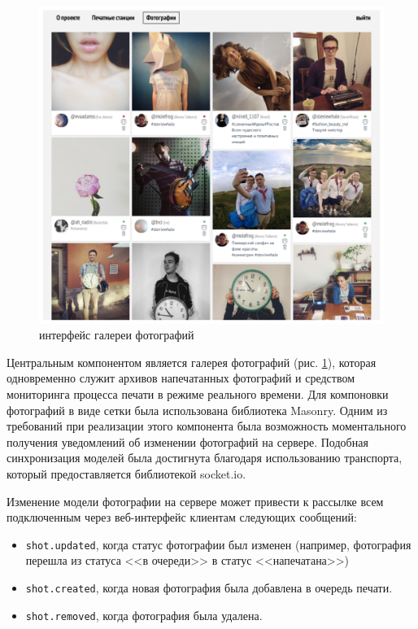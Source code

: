 \documentclass[a4paper,14pt,href,draft]{article}
\begin{document}
\begin{figure}[htbp]
\begin{center}
  \includegraphics[scale=0.53]{grid-interface.pdf}
    \caption{интерфейс галереи фотографий}
    \label{fig:GridInterface}
\end{center}
\end{figure}

Центральным компонентом является галерея фотографий (рис. \ref{fig:GridInterface}), которая одновременно служит
архивов напечатанных фотографий и средством мониторинга процесса печати в режиме реального времени. Для компоновки
фотографий в виде сетки была использована библиотека Masonry\cite{Masonry}. Одним из требований при реализации
этого компонента была возможность моментального получения уведомлений об изменении фотографий на сервере.
Подобная синхронизация моделей была достигнута благодаря использованию транспорта, который предоставляется библиотекой
socket.io\cite{SocketIO}.

Изменение модели фотографии на сервере может привести к рассылке всем подключенным через веб-интерфейс клиентам
следующих сообщений:
\begin{itemize}
  \item \texttt{shot.updated}, когда статус фотографии был изменен (например, фотография перешла из статуса <<в очереди>>
  в статус <<напечатана>>)
  \item \texttt{shot.created}, когда новая фотография была добавлена в очередь печати.
  \item \texttt{shot.removed}, когда фотография была удалена.
\end{itemize}
\end{document}
